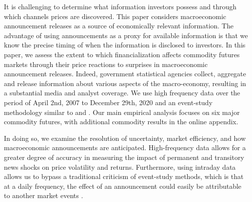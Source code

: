 \documentclass[12pt]{article}
\begin{document}
It is challenging to determine what information investors possess and through which channels prices are discovered. This paper considers macroeconomic announcement releases as a source of economically relevant information. The advantage of using announcements as a proxy for available information is that we know the precise timing of when the information is disclosed to investors.
In this paper, we assess the extent to which financialization affects commodity futures markets through their price reactions to surprises in macroeconomic announcement releases. Indeed, government statistical agencies collect, aggregate and release information about various aspects of the macro-economy, resulting in a substantial media and analyst coverage. We use high frequency data over the period of April 2nd, 2007 to December 29th, 2020 and  an event-study methodology similar to \citet*{andersen2007real} and \citet*{kurov2019price}. Our main empirical analysis focuses on six major commodity futures, with additional commodity results in the online appendix. 

In doing so, we examine the resolution of uncertainty, market efficiency, and how macroeconomic announcements are anticipated. High-frequency data allows for a greater degree of accuracy in measuring the impact of permanent and transitory news shocks on price volatility and returns.  Furthermore, using intraday data allows us to bypass a traditional criticism of event-study methods, which is that at a daily frequency, the effect of an announcement could easily be attributable to another market events \citep*[see e.g., ][]{kothari2007econometrics}. 

\end{document}
